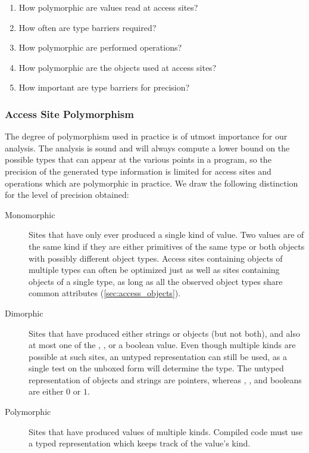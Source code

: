 \begin{enumerate}
\setlength{\itemindent}{2.5em}

\item[\Section\ref{sec:access_polymorphism}] How polymorphic are values read at access sites?

\item[\Section\ref{sec:barriers}] How often are type barriers required?

\item[\Section\ref{sec:operations}] How polymorphic are performed operations?

\item[\Section\ref{sec:access_objects}] How polymorphic are the objects used at access sites?

\item[\Section\ref{sec:without_barriers}] How important are type barriers for precision?

\end{enumerate}



\subsubsection{Access Site Polymorphism}
\label{sec:access_polymorphism}

The degree of polymorphism used in practice is of utmost importance
for our analysis.
The analysis is sound and will always compute a lower bound on the possible
types that can appear at the various points in a program,
so the precision of the generated type information is limited for
access sites and operations which are polymorphic in practice.
We draw the following distinction for the level of precision obtained:

\begin{description}

\item[Monomorphic] Sites that have only ever produced a single kind of value.
Two values are of the same kind if they are either primitives of the same
type or both objects with possibly different
object types.
Access sites containing objects of multiple types can often be optimized
just as well as sites containing objects of a single type, as long as
all the observed object types share common attributes (\Section\ref{sec:access_objects}).

\item[Dimorphic] Sites that have produced either strings or objects (but not both),
and also at most one of the , , or a boolean value.
Even though multiple kinds are possible at such sites, an untyped
representation can still be used,
as a single test on the unboxed form will determine the type.
The untyped representation of objects and strings are pointers,
whereas , , and booleans are either $0$ or $1$.

\item[Polymorphic] Sites that have produced values of multiple kinds.
Compiled code must use a typed representation which keeps track of
the value's kind.

\end{description}

